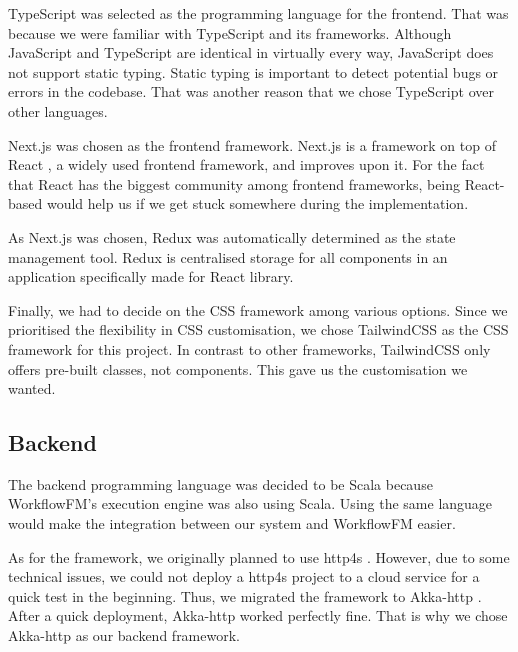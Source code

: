 TypeScript \cite{typescript} was selected as the programming language for the frontend. That was because we were familiar with TypeScript and its frameworks. 
Although JavaScript \cite{javascript} and TypeScript are identical in virtually every way, JavaScript does not support static typing. Static typing is important to detect potential bugs or errors in the codebase. That was another reason that we chose TypeScript over other languages.

Next.js \cite{nextjs} was chosen as the frontend framework. Next.js is a framework on top of React \cite{react}, a widely used frontend framework, and improves upon it. For the fact that React has the biggest community among frontend frameworks, being React-based would help us if we get stuck somewhere during the implementation.


As Next.js was chosen, Redux \cite{redux} was automatically determined as the state management tool. Redux is centralised storage for all components in an application specifically made for React library.

Finally, we had to decide on the CSS framework among various options. Since we prioritised the flexibility in CSS customisation, we chose TailwindCSS \cite{tailwindcss} as the CSS framework for this project. In contrast to other frameworks, TailwindCSS only offers pre-built classes, not components. This gave us the customisation we wanted.

\subsection{Backend}
The backend programming language was decided to be Scala \cite{scala} because WorkflowFM's execution engine was also using Scala. Using the same language would make the integration between our system and WorkflowFM easier.

As for the framework, we originally planned to use http4s \cite{http4s}. However, due to some technical issues, we could not deploy a http4s project to a cloud service for a quick test in the beginning. Thus, we migrated the framework to Akka-http \cite{akka}. After a quick deployment, Akka-http worked perfectly fine. That is why we chose Akka-http as our backend framework.

